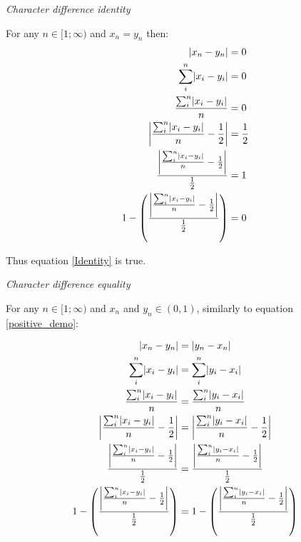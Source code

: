 \documentclass[12pt,letterpaper]{article}
\DeclarePairedDelimiter\abs{\lvert}{\rvert}%
\renewcommand{\subsection}[1]{%
\bigskip
\begin{center}
\begin{large}
\normalfont\itshape #1
\end{large}
\end{center}}
\begin{document}
\subsection{Character difference identity}

For any $n \in [1;\infty)$ and $x_{n} = y_{n}$ then:
\begin{equation}
    \label{identitydemo}
    \begin{aligned}
    \abs{x_{n}-y_{n}} &= 0\\
    \sum_{i}^{n}\abs{x_{i}-y_{i}} &= 0\\
    \frac{\sum_{i}^{n}\abs{x_{i}-y_{i}}}{n} &= 0\\
    \abs*{\frac{\sum_{i}^{n}\abs{x_{i}-y_{i}}}{n}-\frac{1}{2}} &= \frac{1}{2}\\
    \frac{\abs*{\frac{\sum_{i}^{n}\abs{x_{i}-y_{i}}}{n}-\frac{1}{2}}}{\frac{1}{2}} &= 1\\
    1 - \left(\frac{\abs*{\frac{\sum_{i}^{n}\abs{x_{i}-y_{i}}}{n}-\frac{1}{2}}}{\frac{1}{2}}\right) &= 0\\
    \end{aligned}
\end{equation}

Thus equation \ref{Identity} is true.

\subsection{Character difference equality}

For any $n \in [1;\infty)$ and $x_{n}$ and $y_{n} \in (0,1)$, similarly to equation \ref{positive_demo}:

\begin{equation}
    \label{equality_demo}
    \begin{aligned}
    \abs{x_{n}-y_{n}} &= \abs{y_{n}-x_{n}}\\
    \sum_{i}^{n}\abs{x_{i}-y_{i}} &= \sum_{i}^{n}\abs{y_{i}-x_{i}}\\
    \frac{\sum_{i}^{n}\abs{x_{i}-y_{i}}}{n} &= \frac{\sum_{i}^{n}\abs{y_{i}-x_{i}}}{n}\\
    \abs*{\frac{\sum_{i}^{n}\abs{x_{i}-y_{i}}}{n}-\frac{1}{2}} &= \abs*{\frac{\sum_{i}^{n}\abs{y_{i}-x_{i}}}{n}-\frac{1}{2}}\\
    \frac{\abs*{\frac{\sum_{i}^{n}\abs{x_{i}-y_{i}}}{n}-\frac{1}{2}}}{\frac{1}{2}} &= \frac{\abs*{\frac{\sum_{i}^{n}\abs{y_{i}-x_{i}}}{n}-\frac{1}{2}}}{\frac{1}{2}}\\
    1 - \left(\frac{\abs*{\frac{\sum_{i}^{n}\abs{x_{i}-y_{i}}}{n}-\frac{1}{2}}}{\frac{1}{2}}\right) &= 1 - \left(\frac{\abs*{\frac{\sum_{i}^{n}\abs{y_{i}-x_{i}}}{n}-\frac{1}{2}}}{\frac{1}{2}}\right)\\
    \end{aligned}
\end{equation}
\end{document}
